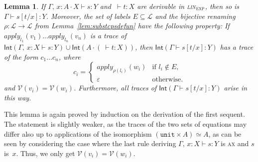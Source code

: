 \documentclass{LMCS}
\theoremstyle{definition}
\theoremstyle{plain}
\newtheorem{lemma}[thm]{Lemma}
\newcommand{\kw}[1]{\mathsf{#1}}
\newcommand{\unit}{\mathtt{unit}}
\newcommand{\Capply}{\textit{apply}}
\newcommand{\I}[2]{#1 \colon #2}
\newcommand{\J}[3]{#1 \colon #2 \cdot #3}
\newcommand{\R}[1]{\textsc{#1}}
\newcommand{\SeqTm}[3]{#1 \vdash #2 \colon #3}
\newcommand{\LL}{\mathcal{L}}
\newcommand{\semc}[1]{\kw{Int}(#1)}
\newcommand{\iso}{\simeq}
\newcommand{\linexp}{\textsc{lin}$_\textsc{exp}$\xspace}
\begin{document}
\begin{lemma}
  \label{lem:subst}
  If\/
  $\SeqTm{\Gamma,\, \J x A X}{s}{Y}$ and\/
  $\SeqTm{\ }{t}{X}$
  are derivable in \linexp, then so is\/
  $\SeqTm{\Gamma}{s[t/x]}{Y}$.
  Moreover,
  the set of labels $E\subseteq \LL$ and
  the bijective renaming $\rho\colon \LL \to \LL$
  from Lemma~\ref{lem:substcpsdefun} have 
  the following property:
  If $\Capply_{l_1}(v_1)\dots \Capply_{l_n}(v_n)$
  is a trace of\/ 
  $\semc{\SeqTm{\Gamma,\, \I x X}{s}{Y}}\cup \semc{A\cdot (\SeqTm{\ }{t}{X})}$,
  then\/ $\semc{\SeqTm{\Gamma}{s[t/x]}{Y}}$ has a trace 
  of the form $c_1\dots c_n$, where
  \[
    c_i = 
    \begin{cases}
      \Capply_{\rho(l_i)}(w_i) & \text{if $l_i \notin E$,} \\
      \varepsilon & \text{otherwise.}
    \end{cases}
  \]
  and\/ $\mathcal{V}(v_i) = \mathcal{V}(w_i)$.
  Furthermore, all traces of\/ $\semc{\SeqTm{\Gamma}{s[t/x]}{Y}}$
  arise in this way.
\end{lemma}
This lemma is again proved by induction on the derivation of
the first sequent. The statement is slightly weaker, as 
the traces of the two sets of equations may differ also
up to applications of the isomorphism $(\unit \times A) \iso A$,
as can be seen by considering the case where the last rule deriving 
$\SeqTm{\Gamma,\, \I x X}{s}{Y}$ is \R{ax} and $s$ is~$x$.
Thus, we only get $\mathcal{V}(v_i) = \mathcal{V}(w_i)$.
\end{document}
